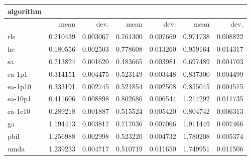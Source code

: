 \begin{tabular}{@{}l*{6}{>{{}}N{1}{2}}@{}}
\toprule
{algorithm} &  &  &  \\
\midrule
& {mean} & {dev.} & {mean} & {dev.} & {mean} & {dev.} \\
\midrule
rls & 0.210439 & 0.003067 & 0.761300 & 0.007669 & 0.971738 & 0.008822 \\
 hc & 0.180556 & 0.002503 & 0.778608 & 0.013260 & 0.959164 & 0.014317 \\
 sa & 0.213824 & 0.001620 & 0.483665 & 0.003981 & 0.697489 & 0.004703 \\
 ea-1p1 & 0.314151 & 0.004475 & 0.523149 & 0.003448 & 0.837300 & 0.004499 \\
 ea-1p10 & 0.333191 & 0.002745 & 0.521854 & 0.002508 & 0.855045 & 0.004515 \\
 ea-10p1 & 0.411606 & 0.008898 & 0.802686 & 0.006544 & 1.214292 & 0.011735 \\
 ea-1c10 & 0.289218 & 0.001887 & 0.515524 & 0.005420 & 0.804742 & 0.006313 \\
 ga & 1.194413 & 0.003817 & 0.717036 & 0.007066 & 1.911449 & 0.007466 \\
 pbil & 1.256988 & 0.002998 & 0.523220 & 0.004732 & 1.780208 & 0.005374 \\
 umda & 1.239233 & 0.004717 & 0.510719 & 0.011650 & 1.749951 & 0.011506 \\
 \bottomrule
\end{tabular}

